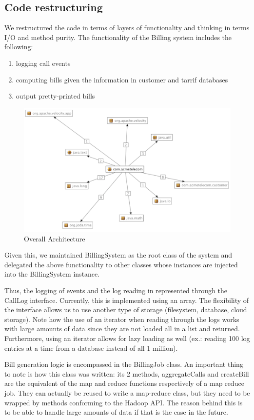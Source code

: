 \documentclass[11pt,twocolumn]{article} %
\begin{document}
\subsection{Code restructuring}
We restructured the code in terms of layers of functionality and thinking in terms I/O and method purity.
The functionality of the Billing system includes the following:
\begin{enumerate}
 \item{logging call events}
 \item{computing bills given the information in customer and tarrif databases}
 \item{output pretty-printed bills}
\end{enumerate}
\begin{figure}[!ht]
\includegraphics[scale=0.30]{Screen Shot 2013-11-21 at 19.00.13.png}
\caption{Overall Architecture}
\end{figure}
Given this, we maintained BillingSystem as the root class of the system and delegated the above functionality to other classes whose
instances are injected into the BillingSystem instance.

Thus, the logging of events and the log reading in represented through the CallLog interface. Currently, this is implemented using an array.
The flexibility of the interface allows us to use another type of storage (filesystem, database, cloud storage). Note how the use of an iterator
when reading through the logs works with large amounts of data since they are not loaded all in a list and returned. Furthermore, using an iterator allows
for lazy loading as well (ex.: reading 100 log entries at a time from a database instead of all 1 million).

Bill generation logic is encompassed in the BillingJob class. An important thing to note is how this class was written: its 2 methods, aggregateCalls
and createBill are the equivalent of the map and reduce functions respectively of a map reduce job. They can actually be reused to write a map-reduce
class, but they need to be wrapped by methods conforming to the Hadoop API. The reason behind this is to be able to handle large amounts of data
if that is the case in the future. 
\end{document}
